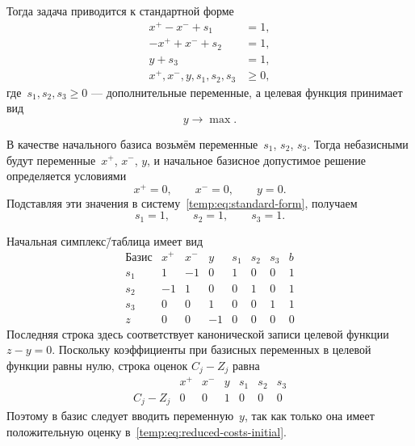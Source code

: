 Тогда задача приводится к стандартной форме
\begin{align}
  x^+ - x^- + s_1 &= 1,\nonumber\\
  -x^+ + x^- + s_2 &= 1,\nonumber\\
  y + s_3 &= 1,\nonumber\\
  x^+, x^-, y, s_1, s_2, s_3 &\geqslant 0,\label{temp:eq:standard-form}
\end{align}
где~$s_1, s_2, s_3 \geqslant 0$ --- дополнительные переменные, а целевая функция принимает вид
\begin{equation*}
  y \to \max.
\end{equation*}

В качестве начального базиса возьмём переменные~$s_1$, $s_2$, $s_3$.
Тогда небазисными будут переменные~$x^+$, $x^-$, $y$, и начальное базисное допустимое решение определяется условиями
\begin{equation*}
  x^+ = 0,
  \qquad
  x^- = 0,
  \qquad
  y = 0.
\end{equation*}
Подставляя эти значения в систему~\eqref{temp:eq:standard-form}, получаем
\begin{equation*}
  s_1 = 1,
  \qquad
  s_2 = 1,
  \qquad
  s_3 = 1.
\end{equation*}

Начальная симплекс\=/таблица имеет вид
\begin{equation*}
  \begin{array}{c|rrrrrr|r}
    \text{Базис} & x^+ & x^- & y & s_1 & s_2 & s_3 & b \\
    \hline
    s_1 & 1 & -1 & 0 & 1 & 0 & 0 & 1 \\
    s_2 & -1 & 1 & 0 & 0 & 1 & 0 & 1 \\
    s_3 & 0 & 0 & 1 & 0 & 0 & 1 & 1 \\
    \hline
    z & 0 & 0 & -1 & 0 & 0 & 0 & 0
  \end{array}
\end{equation*}
Последняя строка здесь соответствует канонической записи целевой функции $z - y = 0$.
Поскольку коэффициенты при базисных переменных в целевой функции равны нулю, строка оценок $C_j - Z_j$ равна
\begin{equation}
  \begin{array}{c|rrrrrr}
     & x^+ & x^- & y & s_1 & s_2 & s_3 \\
    \hline
    C_j - Z_j & 0 & 0 & 1 & 0 & 0 & 0
  \end{array}
  \label{temp:eq:reduced-costs-initial}
\end{equation}
Поэтому в базис следует вводить переменную~$y$, так как только она имеет положительную оценку в~\eqref{temp:eq:reduced-costs-initial}.

